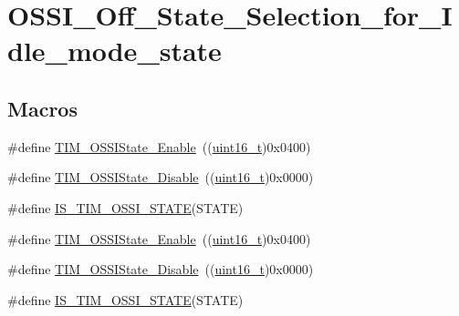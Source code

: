 \hypertarget{group___o_s_s_i___off___state___selection__for___idle__mode__state}{}\section{O\+S\+S\+I\+\_\+\+Off\+\_\+\+State\+\_\+\+Selection\+\_\+for\+\_\+\+Idle\+\_\+mode\+\_\+state}
\label{group___o_s_s_i___off___state___selection__for___idle__mode__state}
\subsection*{Macros}
\begin{DoxyCompactItemize}
\item 
\#define \hyperlink{group___o_s_s_i___off___state___selection__for___idle__mode__state_gaf643ec0d2edb6c8fb725d00210b3d071}{T\+I\+M\+\_\+\+O\+S\+S\+I\+State\+\_\+\+Enable}~((\hyperlink{_p_e___types_8h_a1f1825b69244eb3ad2c7165ddc99c956}{uint16\+\_\+t})0x0400)
\item 
\#define \hyperlink{group___o_s_s_i___off___state___selection__for___idle__mode__state_gae1962736fd5cad82e97a5814ef6758bd}{T\+I\+M\+\_\+\+O\+S\+S\+I\+State\+\_\+\+Disable}~((\hyperlink{_p_e___types_8h_a1f1825b69244eb3ad2c7165ddc99c956}{uint16\+\_\+t})0x0000)
\item 
\#define \hyperlink{group___o_s_s_i___off___state___selection__for___idle__mode__state_gad24fc8836152903b408239284cecfab1}{I\+S\+\_\+\+T\+I\+M\+\_\+\+O\+S\+S\+I\+\_\+\+S\+T\+A\+TE}(S\+T\+A\+TE)
\item 
\#define \hyperlink{group___o_s_s_i___off___state___selection__for___idle__mode__state_gaf643ec0d2edb6c8fb725d00210b3d071}{T\+I\+M\+\_\+\+O\+S\+S\+I\+State\+\_\+\+Enable}~((\hyperlink{_p_e___types_8h_a1f1825b69244eb3ad2c7165ddc99c956}{uint16\+\_\+t})0x0400)
\item 
\#define \hyperlink{group___o_s_s_i___off___state___selection__for___idle__mode__state_gae1962736fd5cad82e97a5814ef6758bd}{T\+I\+M\+\_\+\+O\+S\+S\+I\+State\+\_\+\+Disable}~((\hyperlink{_p_e___types_8h_a1f1825b69244eb3ad2c7165ddc99c956}{uint16\+\_\+t})0x0000)
\item 
\#define \hyperlink{group___o_s_s_i___off___state___selection__for___idle__mode__state_gad24fc8836152903b408239284cecfab1}{I\+S\+\_\+\+T\+I\+M\+\_\+\+O\+S\+S\+I\+\_\+\+S\+T\+A\+TE}(S\+T\+A\+TE)
\end{DoxyCompactItemize}


